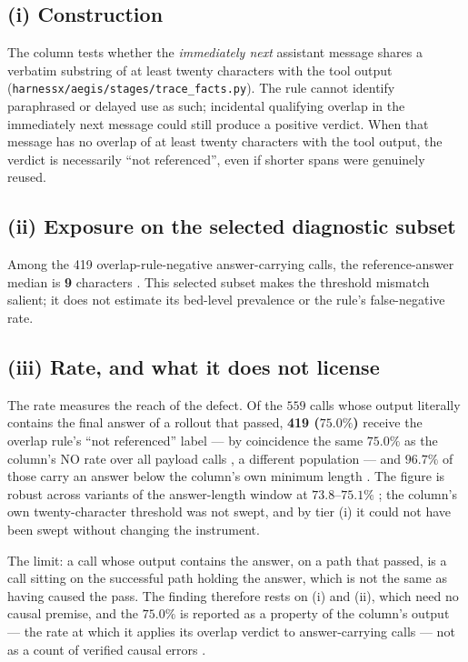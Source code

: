 \subsection*{(i) Construction}

The column tests whether the \emph{immediately next} assistant message
shares a verbatim substring of at least twenty characters with the tool
output (\texttt{harnessx/\allowbreak aegis/\allowbreak stages/\allowbreak trace\_facts.py}). The rule cannot identify paraphrased or delayed use as such; incidental
qualifying overlap in the immediately next message could still produce a
positive verdict. When that message has no overlap of at least twenty
characters with the tool output, the verdict is necessarily ``not
referenced'', even if shorter spans were genuinely reused.

\subsection*{(ii) Exposure on the selected diagnostic subset}

Among the 419 overlap-rule-negative answer-carrying calls, the
reference-answer median is \textbf{9} characters . This selected subset
makes the threshold mismatch salient; it does not estimate its bed-level
prevalence or the rule's false-negative rate.



\subsection*{(iii) Rate, and what it does not license}

The rate measures the reach of the defect. Of the $559$ calls whose output literally
contains the final answer of a rollout that passed, \textbf{419
($75.0\%$)} receive the overlap rule's ``not referenced'' label --- by
coincidence the same $75.0\%$ as the column's NO rate over all payload
calls , a different population --- and
$96.7\%$ of those carry an answer below the column's own minimum length
. The figure is robust
across variants of the answer-length window at $73.8$--$75.1\%$ ;
the column's own twenty-character threshold was not swept, and by tier (i)
it could not have been swept without changing the instrument.

The limit: a call whose output contains the answer, on a path that passed,
is a call sitting on the successful path holding the answer, which is not
the same as having caused the pass. The finding
therefore rests on (i) and (ii), which need no causal premise, and the
$75.0\%$ is reported as a property of the column's output --- the rate at
which it applies its overlap verdict to answer-carrying calls --- not as a
count of verified causal errors .

